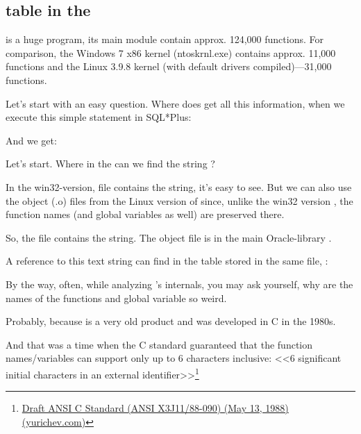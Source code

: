 \subsection{ table in the \oracle}

\myindex{\oracle}
 is a huge program, its main module  contain approx. 124,000 functions. For comparison, the Windows 7 x86 kernel (ntoskrnl.exe) contains approx. 11,000 functions and the Linux 3.9.8 kernel
(with default drivers compiled)---31,000 functions.

Let's start with an easy question. Where does \oracle get all this information, when we execute this simple statement in SQL*Plus:



And we get:



Let's start. Where in the \oracle can we find the string ?

In the win32-version,  file contains the string,
it's easy to see.
But we can also use the object (.o) files from the Linux version of \oracle since, unlike the win32 version , the function names (and global variables as well) are preserved there.

So, the  file contains the  string.
The object file is in the main Oracle-library .

A reference to this text string can find in the  table stored in the same file, :



By the way, often, while analyzing \oracle's internals, you may ask yourself, why are the names of the functions and global variable so weird.

Probably, because \oracle is a very old product and was developed in C in the 1980s.

And that was a time when the C standard guaranteed that the function names/variables can support only up to 6 characters inclusive: <<6 significant initial characters in an external identifier>>\footnote{\href{https://yurichev.com/ref/Draft%20ANSI%20C%20Standard%20(ANSI%20X3J11-88-090)%20(May%2013,%201988).txt}{Draft ANSI C Standard (ANSI X3J11/88-090) (May 13, 1988) (yurichev.com)}}

